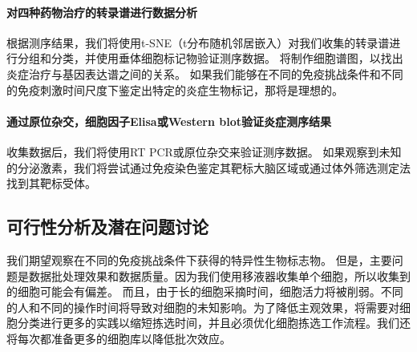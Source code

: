 \paragraph{对四种药物治疗的转录谱进行数据分析}
  根据测序结果，我们将使用t-SNE（t分布随机邻居嵌入）对我们收集的转录谱进行分组和分类，并使用垂体细胞标记物验证测序数据。 将制作细胞谱图，以找出炎症治疗与基因表达谱之间的关系。 如果我们能够在不同的免疫挑战条件和不同的免疫刺激时间尺度下鉴定出特定的炎症生物标记，那将是理想的。
\paragraph{通过原位杂交，细胞因子Elisa或Western blot验证炎症测序结果}
  收集数据后，我们将使用RT PCR或原位杂交来验证测序数据。 如果观察到未知的分泌激素，我们将尝试通过免疫染色鉴定其靶标大脑区域或通过体外筛选测定法找到其靶标受体。

\subsection{可行性分析及潜在问题讨论}
  我们期望观察在不同的免疫挑战条件下获得的特异性生物标志物。 但是，主要问题是数据批处理效果和数据质量。因为我们使用移液器收集单个细胞，所以收集到的细胞可能会有偏差。 而且，由于长的细胞采摘时间，细胞活力将被削弱。不同的人和不同的操作时间将导致对细胞的未知影响。为了降低主观效果，将需要对细胞分类进行更多的实践以缩短拣选时间，并且必须优化细胞拣选工作流程。我们还将每次都准备更多的细胞库以降低批次效应。

